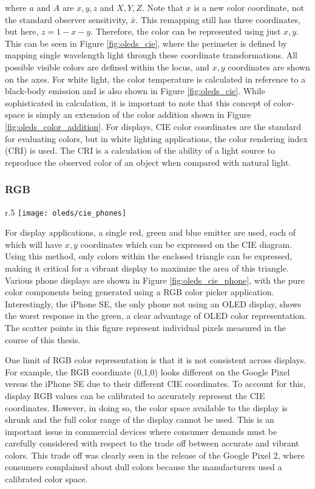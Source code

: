 \documentclass[../thesis.tex]{subfiles}
\begin{document}
where $a$ and $A$ are $x,y,z$ and $X,Y,Z$.
Note that $x$ is a new color coordinate, not the standard observer sensitivity, $\bar{x}$.
This remapping still has three coordinates, but here, $z=1-x-y$.
Therefore, the color can be represented using just $x,y$.
This can be seen in Figure \ref{fig:oleds_cie}, where the perimeter is defined by mapping single wavelength light through these coordinate transformations.
All possible visible colors are defined within the locus, and $x,y$ coordinates are shown on the axes.
For white light, the color temperature is calculated in reference to a black-body emission and is also shown in Figure \ref{fig:oleds_cie}.
While sophisticated in calculation, it is important to note that this concept of color-space is simply an extension of the color addition shown in Figure \ref{fig:oleds_color_addition}.
For displays, CIE color coordinates are the standard for evaluating colors, but in white lighting applications, the color rendering index (CRI) is used.
The CRI is a calculation of the ability of a light source to reproduce the observed color of an object when compared with natural light.

\subsubsection{RGB}
\begin{wrapfigure}{r}{.5\textwidth}
\texttt{[image: oleds/cie\_phones]}
\caption{Various phone display limits shown on CIE coordinates. Each point shown is the CIE coordinates of devices grown during this thesis work.}
\label{fig:oleds_cie_phone}
\end{wrapfigure}

For display applications, a single red, green and blue emitter are used, each of which will have $x,y$ coordinates which can be expressed on the CIE diagram.
Using this method, only colors within the enclosed triangle can be expressed, making it critical for a vibrant display to maximize the area of this triangle.
Various phone displays are shown in Figure \ref{fig:oleds_cie_phone}, with the pure color components being generated using a RGB color picker application.
Interestingly, the iPhone SE, the only phone not using an OLED display, shows the worst response in the green, a clear advantage of OLED color representation.
The scatter points in this figure represent individual pixels measured in the course of this thesis.

One limit of RGB color representation is that it is not consistent across displays.
For example, the RGB coordinate (0,1,0) looks different on the Google Pixel versus the iPhone SE due to their different CIE coordinates.
To account for this, display RGB values can be calibrated to accurately represent the CIE coordinates.
However, in doing so, the color space available to the display is shrunk and the full color range of the display cannot be used.
This is an important issue in commercial devices where consumer demands must be carefully considered with respect to the trade off between accurate and vibrant colors.
This trade off was clearly seen in the release of the Google Pixel 2, where consumers complained about dull colors because the manufacturers used a calibrated color space.\supercite{Bohn2017}
\end{document}
